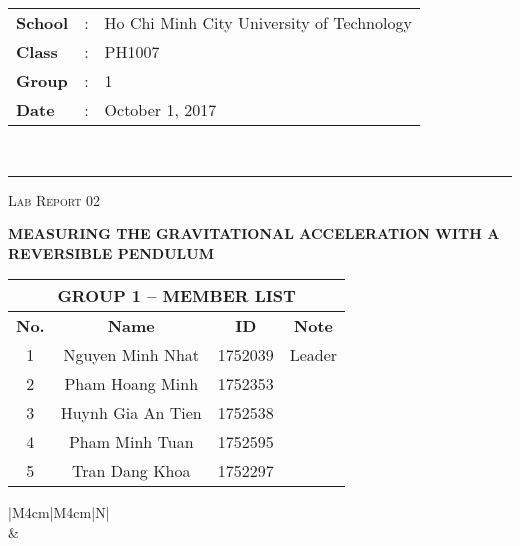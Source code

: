 \documentclass[12pt, a4paper]{article}
\begin{document}
\noindent
\begin{tabular}{lll}
    \textbf{School} & : & Ho Chi Minh City University of Technology \\
    \textbf{Class} & : & PH1007 \\
    \textbf{Group} & : & 1 \\
    \textbf{Date} & : & October 1, 2017 \\
\end{tabular}\\
\rule[2ex]{\textwidth}{2pt}

\vspace{2cm}

\begin{center}
    {\scshape\Large Lab Report 02 \par}
    \vspace{1.5cm}
    {\Huge\bfseries MEASURING THE GRAVITATIONAL ACCELERATION WITH A REVERSIBLE PENDULUM \par}

    \vspace{3cm}

    \begin{tabular}{|c|c|c|c|}
        \hline 
        \multicolumn{4}{|c|}{\textbf{GROUP 1 -- MEMBER LIST}} \\ 
        \hline 
        \textbf{No.} &\qquad\qquad \textbf{Name}\qquad\qquad\qquad & \qquad\textbf{ID}\qquad\qquad & \qquad\textbf{Note}\qquad\qquad \\ 
        \hline 
        1 & Nguyen Minh Nhat  & 1752039 & Leader \\ 
        \hline 
        2 & Pham Hoang Minh   & 1752353 &  \\ 
        \hline 
        3 & Huynh Gia An Tien & 1752538 &  \\ 
        \hline 
        4 & Pham Minh Tuan    & 1752595 &  \\ 
        \hline 
        5 & Tran Dang Khoa    & 1752297 &  \\ 
        \hline 
    \end{tabular} 

    \vspace{3cm}

    \begin{table}[ht]
        \centering
        \begin{tabular}{|M{4cm}|M{4cm}|N|}
            \hline
             \\
            \hline
             &  \\ [50pt]
            \hline
        \end{tabular}
    \end{table}
\end{center}
\end{document}
